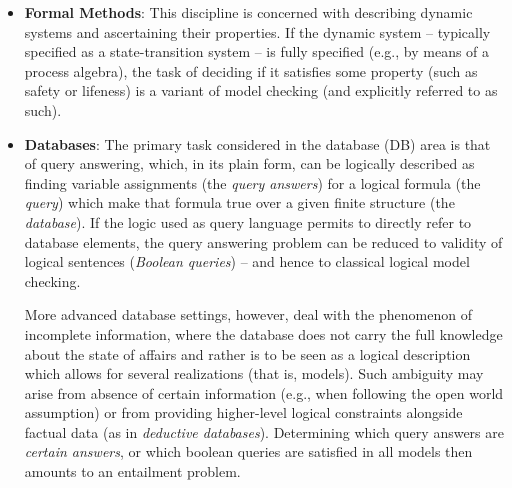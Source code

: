 \begin{itemize}
\item \textbf{Formal Methods}: This discipline is concerned with describing dynamic systems and ascertaining their properties. If the dynamic system -- typically specified as a state-transition system -- is fully specified (e.g., by means of a process algebra), the task of deciding if it satisfies some property (such as safety or lifeness) is a variant of model checking (and explicitly referred to as such).  
\item \textbf{Databases}: The primary task considered in the database (DB) area is that of query answering, which, in its plain form, can be logically described as finding variable assignments (the \emph{query answers}) for a logical formula (the \emph{query}) which make that formula true over a given finite structure (the \emph{database}). 
If the logic used as query language permits to directly refer to database elements, the query answering problem can be reduced to validity of logical sentences (\emph{Boolean queries}) -- and hence to classical logical model checking.

More advanced database settings, however, deal with the phenomenon of incomplete information, where the database does not carry the full knowledge about the state of affairs and rather is to be seen as a logical description which allows for several realizations (that is, models). Such ambiguity may arise from absence of certain information (e.g., when following the open world assumption) or from providing higher-level logical constraints alongside factual data (as in \emph{deductive databases}).  
Determining which query answers are \emph{certain answers}, or which boolean queries are satisfied in all models then amounts to an entailment problem.             


\end{itemize}
